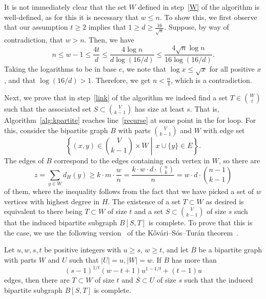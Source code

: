 It is not immediately clear that the set $W$ defined in step~\ref{W} of the algorithm
is well-defined, as for this it is necessary that $w \leq n$.
To show this, we first observe that our assumption $t \geq 2$
implies that $ 1 \geq d \geq \frac{16}{\sqrt{n}}$.
Suppose, by way of contradiction, that $w > n$.
Then, we have
\[
    n \leq w - 1 \leq \frac{4t}{d} \leq \frac{4\log n}{d\log(16/d)} \leq \frac{4 \sqrt{n} \log n }{16 \log(16/d)}.
\]
Taking the logarithms to be in base $e$, we note that $\log x \leq \sqrt{x}$ for all positive $x$,
and that $\log(16/d) > 1$.
Therefore, we get $n < \frac{n}{4}$, which is a contradiction.

Next, we prove that in step~\ref{link} of the algorithm
we indeed find a set $T \in \binom{W}{t}$ such that the associated set
$S \subset \binom{V}{k-1}$ has size at least $s$.
That is, Algorithm~\ref{alg:kpartite} reaches line~\ref{recurse} at some point in the for loop.
For this, consider the bipartite graph $B$ with parts $\binom{V}{k-1}$ and $W$ with edge set
\[
  \left\{(x, y) \in \binom{V}{k-1} \times W \middle| \, x \cup \{y\} \in E\right\}.
\]
The edges of $B$ correspond to the edges containing each vertex in $W$, so there are
\[
    z = \sum_{y \in W} d_H(y) \geq k \cdot m \cdot \frac{w}{n} = \frac{k \cdot w \cdot d \cdot \binom{n}{k}}{n} = w \cdot d \cdot \binom{n - 1}{k-1}
\]
of them, where the inequality follows from the fact that we have picked a set of $w$ vertices with highest degree in $H$.
The existence of a set $T \subset W$ as desired is equivalent to there being $T \subset W$ of size $t$ and a set $S \subset \binom{V}{k-1}$ of size $s$
such that the induced bipartite subgraph $B[S, T]$ is complete.
To prove that this is the case,
we use the following version~\cite{Hylten1958} of the K\H{o}v\'{a}ri–S\'{o}s–Tur\'{a}n theorem~\cite{Kovari1954}.

\begin{lemma}\label{thm:kst}
    Let $u, w, s, t$ be positive integers with $u \geq s$, $w \geq t$, and let $B$ be a bipartite graph with parts $W$ and $U$ such that
    $|U| = u, |W| = w$.
    If $B$ has more than \[(s - 1)^{1 / t}(w - t + 1)u^{1 - 1 / t} + (t - 1)u\] edges, then there are
    $T \subset W$ of size $t$ and $S \subset U$ of size $s$ such that the induced bipartite subgraph $B[S, T]$ is complete.
\end{lemma}

